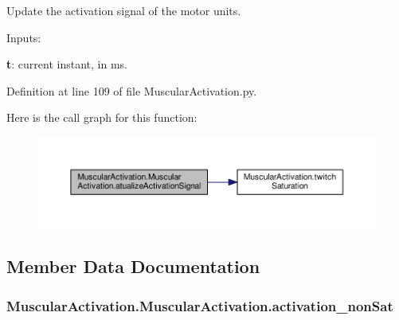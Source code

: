 Update the activation signal of the motor units. 


\begin{DoxyItemize}
\item Inputs\+:
\begin{DoxyItemize}
\item {\bfseries t}\+: current instant, in ms. 
\end{DoxyItemize}
\end{DoxyItemize}

Definition at line 109 of file Muscular\+Activation.\+py.



Here is the call graph for this function\+:
\nopagebreak
\begin{figure}[H]
\begin{center}
\leavevmode
\includegraphics[width=350pt]{class_muscular_activation_1_1_muscular_activation_a426e8eca6ca1f9ed3999a07764ccb8fb_cgraph}
\end{center}
\end{figure}




\subsection{Member Data Documentation}
\subsubsection[{\texorpdfstring{activation\+\_\+non\+Sat}{activation_nonSat}}]{\setlength{\rightskip}{0pt plus 5cm}Muscular\+Activation.\+Muscular\+Activation.\+activation\+\_\+non\+Sat}\hypertarget{class_muscular_activation_1_1_muscular_activation_ae0b34b99d9fdd1d309ff086512d299dd}{}\label{class_muscular_activation_1_1_muscular_activation_ae0b34b99d9fdd1d309ff086512d299dd}


